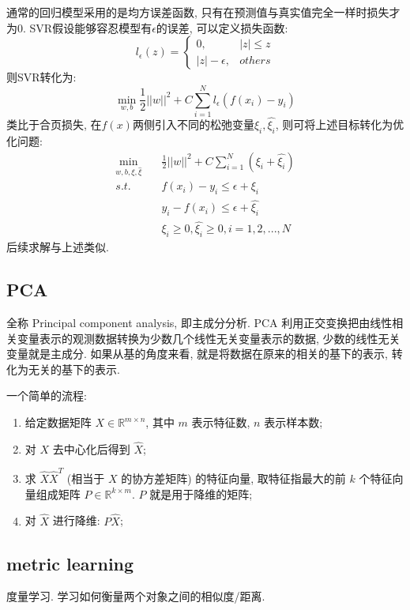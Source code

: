 通常的回归模型采用的是均方误差函数, 只有在预测值与真实值完全一样时损失才为0. SVR假设能够容忍模型有$\epsilon$的误差, 可以定义损失函数: 
$$
l_\epsilon (z) = \begin{cases}0, &|z| \leq z \\ |z| - \epsilon, &others \end{cases}
$$
则SVR转化为: 
$$
\mathop{min}_{w, b} \frac{1}{2} ||w||^2 + C \sum_{i=1}^N l_\epsilon (f(x_i) - y_i) 
$$
类比于合页损失, 在$f(x)$两侧引入不同的松弛变量$\xi_i, \hat{\xi_i}$, 则可将上述目标转化为优化问题: 
\begin{align}
	\mathop{min}_{w, b, \xi, \hat{\xi}}\quad &\frac{1}{2} ||w||^2 + C \sum_{i=1}^{N} (\xi_i + \hat{\xi_i}) \nonumber \\
	s.t.\quad &f(x_i) - y_i \leq \epsilon + \xi_i \nonumber \\
			  &y_i - f(x_i) \leq \epsilon + \hat{\xi_i} \nonumber \\
			  &\xi_i \geq 0, \hat{\xi_i} \geq 0, i = 1, 2, ..., N \nonumber
\end{align}
后续求解与上述类似. 


\subsection{PCA}
全称 Principal component analysis, 即主成分分析. PCA 利用正交变换把由线性相关变量表示的观测数据转换为少数几个线性无关变量表示的数据, 少数的线性无关变量就是主成分. 如果从基的角度来看, 就是将数据在原来的相关的基下的表示, 转化为无关的基下的表示. 

一个简单的流程: 
\begin{enumerate}
	\item 给定数据矩阵 $X \in \mathbb{R}^{m \times n}$, 其中 $m$ 表示特征数, $n$ 表示样本数; 
	
	\item 对 $X$ 去中心化后得到 $\hat{X}$; 
	
	\item 求 $\hat{X} \hat{X}^T$  (相当于 $X$ 的协方差矩阵) 的特征向量, 取特征指最大的前 $k$ 个特征向量组成矩阵 $P \in \mathbb{R}^{k \times m}$. $P$ 就是用于降维的矩阵; 
	
	\item 对 $\hat{X}$ 进行降维: $P \hat{X}$; 
\end{enumerate}


\subsection{metric learning} 
度量学习. 学习如何衡量两个对象之间的相似度/距离. 

